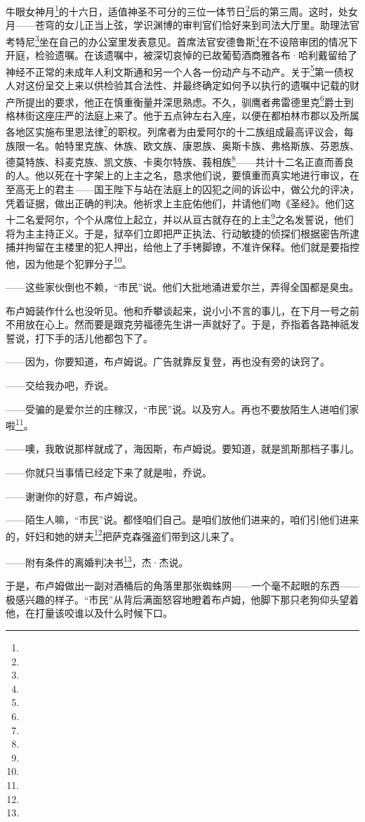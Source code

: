 \par 牛眼女神月\footnote{}的十六日，适值神圣不可分的三位一体节日\footnote{}后的第三周。这时，处女月——苍穹的女儿正当上弦，学识渊博的审判官们恰好来到司法大厅里。助理法官考特尼\footnote{}坐在自己的办公室里发表意见。首席法官安德鲁斯\footnote{}在不设陪审团的情况下开庭，检验遗嘱。在该遗嘱中，被深切哀悼的已故葡萄酒商雅各布·哈利戴留给了神经不正常的未成年人利文斯通和另一个人各一份动产与不动产。关于\footnote{}第一债权人对这份呈交上来以供检验其合法性、并最终确定如何予以执行的遗嘱中记载的财产所提出的要求，他正在慎重衡量并深思熟虑。不久，驯鹰者弗雷德里克\footnote{}爵士到格林街这座庄严的法庭上来了。他于五点钟左右入座，以便在都柏林市郡以及所属各地区实施布里恩法律\footnote{}的职权。列席者为由爱阿尔的十二族组成最高评议会，每族限一名。帕特里克族、休族、欧文族、康恩族、奥斯卡族、弗格斯族、芬恩族、德莫特族、科麦克族、凯文族、卡奥尔特族、莪相族\footnote{}——共计十二名正直而善良的人。他以死在十字架上的上主之名，恳求他们说，要慎重而真实地进行审议，在至高无上的君主——国王陛下与站在法庭上的囚犯之间的诉讼中，做公允的评决，凭着证据，做出正确的判决。他祈求上主庇佑他们，并请他们吻《圣经》。他们这十二名爱阿尔，个个从席位上起立，并以从亘古就存在的上主\footnote{}之名发誓说，他们将为主主持正义。于是，狱卒们立即把严正执法、行动敏捷的侦探们根据密告所逮捕并拘留在主楼里的犯人押出，给他上了手铐脚镣，不准许保释。他们就是要指控他，因为他是个犯罪分子\footnote{}。
\par ——这些家伙倒也不赖，“市民”说。他们大批地涌进爱尔兰，弄得全国都是臭虫。
\par 布卢姆装作什么也没听见。他和乔攀谈起来，说小小不言的事儿，在下月一号之前不用放在心上。然而要是跟克劳福德先生讲一声就好了。于是，乔指着各路神祇发誓说，打下手的活儿他都包下了。
\par ——因为，你要知道，布卢姆说。广告就靠反复登，再也没有旁的诀窍了。
\par ——交给我办吧，乔说。
\par ——受骗的是爱尔兰的庄稼汉，“市民”说。以及穷人。再也不要放陌生人进咱们家啦\footnote{}。
\par ——噢，我敢说那样就成了，海因斯，布卢姆说。要知道，就是凯斯那档子事儿。
\par ——你就只当事情已经定下来了就是啦，乔说。
\par ——谢谢你的好意，布卢姆说。
\par ——陌生人嘛，“市民”说。都怪咱们自己。是咱们放他们进来的，咱们引他们进来的，奸妇和她的姘夫\footnote{}把萨克森强盗们带到这儿来了。
\par ——附有条件的离婚判决书\footnote{}，杰·杰说。
\par 于是，布卢姆做出一副对酒桶后的角落里那张蜘蛛网——一个毫不起眼的东西——极感兴趣的样子。“市民”从背后满面怒容地瞪着布卢姆，他脚下那只老狗仰头望着他，在打量该咬谁以及什么时候下口。
